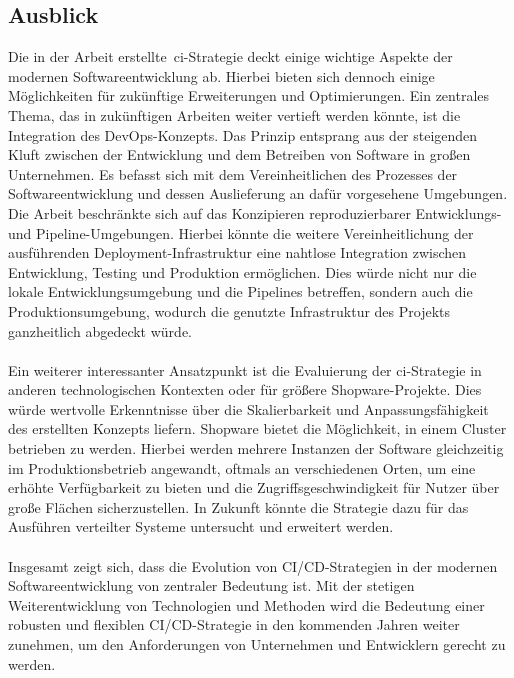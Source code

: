 \subsection{Ausblick} \label{subsec:06-prospect-2}

Die in der Arbeit erstellte\ \acrshort{ci}-Strategie deckt einige wichtige Aspekte der modernen Softwareentwicklung
ab.
Hierbei bieten sich dennoch einige Möglichkeiten für zukünftige Erweiterungen und Optimierungen.
Ein zentrales Thema, das in zukünftigen Arbeiten weiter vertieft werden könnte, ist die Integration des
\glqq DevOps\grqq-Konzepts.
Das Prinzip entsprang aus der steigenden Kluft zwischen der Entwicklung und dem Betreiben von Software in großen
Unternehmen.
Es befasst sich mit dem Vereinheitlichen des Prozesses der Softwareentwicklung und dessen Auslieferung an
dafür vorgesehene Umgebungen.
Die Arbeit beschränkte sich auf das Konzipieren reproduzierbarer Entwicklungs- und Pipeline-Umgebungen.
Hierbei könnte die weitere Vereinheitlichung der ausführenden Deployment-Infrastruktur eine nahtlose Integration
zwischen Entwicklung, Testing und Produktion ermöglichen.
Dies würde nicht nur die lokale Entwicklungsumgebung und die Pipelines betreffen, sondern auch die
Produktionsumgebung, wodurch die genutzte Infrastruktur des Projekts ganzheitlich abgedeckt würde.
\\\\
Ein weiterer interessanter Ansatzpunkt ist die Evaluierung der \acrshort{ci}-Strategie in anderen technologischen
Kontexten oder für größere Shopware-Projekte.
Dies würde wertvolle Erkenntnisse über die Skalierbarkeit und Anpassungsfähigkeit des erstellten Konzepts liefern.
Shopware bietet die Möglichkeit, in einem Cluster betrieben zu werden.
Hierbei werden mehrere Instanzen der Software gleichzeitig im Produktionsbetrieb angewandt, oftmals an
verschiedenen Orten, um eine erhöhte Verfügbarkeit zu bieten und die Zugriffsgeschwindigkeit für Nutzer über große
Flächen sicherzustellen.
In Zukunft könnte die Strategie dazu für das Ausführen verteilter Systeme untersucht und erweitert werden.
\\\\
Insgesamt zeigt sich, dass die Evolution von CI/CD-Strategien in der modernen Softwareentwicklung von zentraler
Bedeutung ist.
Mit der stetigen Weiterentwicklung von Technologien und Methoden wird die Bedeutung einer robusten und flexiblen
CI/CD-Strategie in den kommenden Jahren weiter zunehmen, um den Anforderungen von Unternehmen und Entwicklern gerecht
zu werden.

\clearpage
